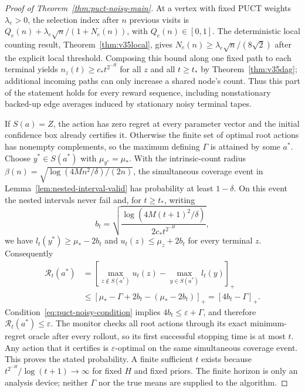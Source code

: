 \documentclass{article}
\theoremstyle{plain}
\theoremstyle{definition}
\begin{document}
\begin{proof}[Proof of Theorem~\ref{thm:puct-noisy-main}]
At a vertex with fixed PUCT weights $\lambda_e>0$, the selection index after
$n$ previous visits is
$Q_e(n)+\lambda_e\sqrt n/(1+N_e(n))$, with $Q_e(n)\in[0,1]$.
The deterministic local counting result, Theorem~\ref{thm:v35local}, gives
$N_e(n)\ge \lambda_e\sqrt n/(8\sqrt2)$ after the explicit local threshold.
Composing this bound along one fixed path to each terminal yields
$n_z(t)\ge c_*t^{2^{-H}}$ for all $z$ and all $t\ge t_*$ by
Theorem~\ref{thm:v35dag}; additional incoming paths can only increase a
shared node's count. Thus this part of the statement holds for every reward
sequence, including nonstationary backed-up edge averages induced by
stationary noisy terminal tapes.

If $S(a)=Z$, the action has zero regret at every parameter vector and the
initial confidence box already certifies it. Otherwise the finite set of
optimal root actions has nonempty complements, so the maximum defining
$\Gamma$ is attained by some $a^*$. Choose $y^*\in S(a^*)$ with
$\mu_{y^*}=\mu_*$. With the intrinsic-count radius
$\beta(n)=\sqrt{\log(4Mn^2/\delta)/(2n)}$, the simultaneous coverage event
in Lemma~\ref{lem:nested-interval-valid} has probability at least $1-\delta$.
On this event the nested intervals never fail and, for $t\ge t_*$, writing
\[
 b_t=\sqrt{\frac{\log(4M(t+1)^2/\delta)}
                     {2c_*t^{2^{-H}}}},
\]
we have $l_t(y^*)\ge\mu_*-2b_t$ and
$u_t(z)\le\mu_z+2b_t$ for every terminal $z$. Consequently
\begin{align*}
 \mathcal R_t(a^*)
 &=\left[\max_{z\notin S(a^*)}u_t(z)
            -\max_{y\in S(a^*)}l_t(y)\right]_+\\
 &\le [\mu_*-\Gamma+2b_t-(\mu_*-2b_t)]_+
   =[4b_t-\Gamma]_+.
\end{align*}
Condition~\eqref{eq:puct-noisy-condition} implies
$4b_t\le\varepsilon+\Gamma$, and therefore
$\mathcal R_t(a^*)\le\varepsilon$.
The monitor checks all root actions through its exact minimum-regret oracle
after every rollout, so its first successful stopping time is at most $t$.
Any action that it certifies is $\varepsilon$-optimal on the same simultaneous
coverage event. This proves the stated probability. A finite sufficient $t$ exists because
$t^{2^{-H}}/\log(t+1)\to\infty$ for fixed $H$ and fixed priors.
The finite horizon is only an analysis device; neither $\Gamma$ nor the true
means are supplied to the algorithm.
\end{proof}
\end{document}
